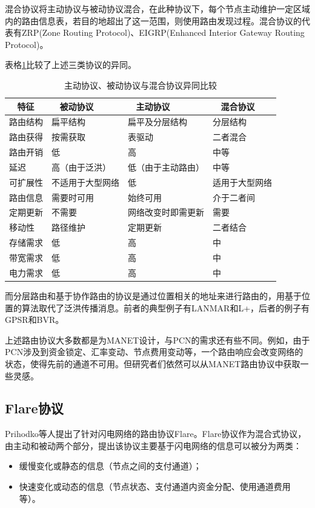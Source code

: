 \documentclass[12pt,a4paper]{article}
\begin{document}
混合协议将主动协议与被动协议混合，在此种协议下，每个节点主动维护一定区域内的路由信息表，若目的地超出了这一范围，则使用路由发现过程。混合协议的代表有ZRP(Zone Routing Protocol)、EIGRP(Enhanced Interior Gateway Routing Protocol)。

表格\ref{protocols}比较了上述三类协议的异同。

\begin{table}[htb]
\renewcommand\arraystretch{1.2}
\caption{主动协议、被动协议与混合协议异同比较}
\centering
\begin{tabular}{l l l l}
\label{protocols}
\\
\hline
\hline
~ \textbf{特征} ~ & ~ \textbf{被动协议} ~ & ~ \textbf{主动协议} ~ & ~ \textbf{混合协议} \\[6pt]
\hline
路由结构  & 扁平结构 & 扁平及分层结构 & 分层结构 \\[6pt]
\hline
路由获得 & 按需获取 & 表驱动 & 二者混合
\\[6pt]
\hline
路由开销 & 低 & 高 & 中等
\\[6pt]
\hline
延迟 & 高（由于泛洪） & 低（由于主动路由） & 中等
\\[6pt]
\hline
可扩展性 & 不适用于大型网络 & 低 & 适用于大型网络
\\[6pt]
\hline
路由信息 & 需要时可用 & 始终可用 & 介于二者间
\\[6pt]
\hline
定期更新 & 不需要 & 网络改变时即需更新 & 需要
\\[6pt]
\hline
移动性 & 路径维护 & 定期更新 & 二者结合
\\[6pt]
\hline
存储需求 & 低 & 高 & 中
\\[6pt]
\hline
带宽需求 & 低 & 高 & 中
\\[6pt]
\hline
电力需求 & 低 & 高 & 中
\\[6pt]
\hline
\hline
\end{tabular}
\end{table}

而分层路由和基于协作路由的协议是通过位置相关的地址来进行路由的，用基于位置的算法取代了泛洪传播消息。前者的典型例子有LANMAR\cite{Guangyu}和L+\cite{mitton2005distributed}，后者的例子有GPSR\cite{Karp2000}和BVR\cite{fonseca2005beacon}。

上述路由协议大多数都是为MANET设计，与PCN的需求还有些不同。例如，由于PCN涉及到资金锁定、汇率变动、节点费用变动等，一个路由响应会改变网络的状态，使得先前的通道不可用。但研究者们依然可以从MANET路由协议中获取一些灵感。

\clearpage

\subsection{Flare协议}
Prihodko等人提出了针对闪电网络的路由协议Flare\cite{prihodko2016flare}。Flare协议作为混合式协议，由主动和被动两个部分，提出该协议主要基于闪电网络的信息可以被分为两类：
\begin{itemize}
	\item 缓慢变化或静态的信息（节点之间的支付通道）；
	\item 快速变化或动态的信息（节点状态、支付通道内资金分配、使用通道费用等）。
\end{itemize}
\end{document}
